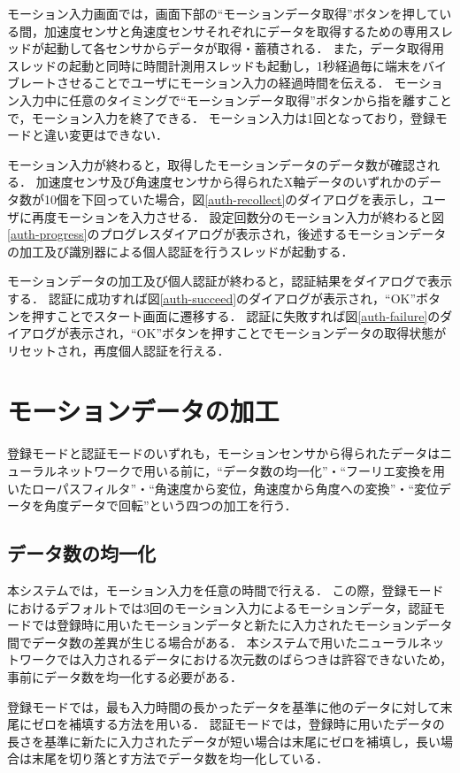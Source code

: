 モーション入力画面では，画面下部の``モーションデータ取得''ボタンを押している間，加速度センサと角速度センサそれぞれにデータを取得するための専用スレッドが起動して各センサからデータが取得・蓄積される．
また，データ取得用スレッドの起動と同時に時間計測用スレッドも起動し，1秒経過毎に端末をバイブレートさせることでユーザにモーション入力の経過時間を伝える．
モーション入力中に任意のタイミングで``モーションデータ取得''ボタンから指を離すことで，モーション入力を終了できる．
モーション入力は1回となっており，登録モードと違い変更はできない．

モーション入力が終わると，取得したモーションデータのデータ数が確認される．
加速度センサ及び角速度センサから得られたX軸データのいずれかのデータ数が10個を下回っていた場合，図\ref{auth-recollect}のダイアログを表示し，ユーザに再度モーションを入力させる．
設定回数分のモーション入力が終わると図\ref{auth-progress}のプログレスダイアログが表示され，後述するモーションデータの加工及び識別器による個人認証を行うスレッドが起動する．

モーションデータの加工及び個人認証が終わると，認証結果をダイアログで表示する．
認証に成功すれば図\ref{auth-succeed}のダイアログが表示され，``OK''ボタンを押すことでスタート画面に遷移する．
認証に失敗すれば図\ref{auth-failure}のダイアログが表示され，``OK''ボタンを押すことでモーションデータの取得状態がリセットされ，再度個人認証を行える．

\section{モーションデータの加工}
登録モードと認証モードのいずれも，モーションセンサから得られたデータはニューラルネットワークで用いる前に，``データ数の均一化''・``フーリエ変換を用いたローパスフィルタ''・``角速度から変位，角速度から角度への変換''・``変位データを角度データで回転''という四つの加工を行う．

\subsection{データ数の均一化}
本システムでは，モーション入力を任意の時間で行える．
この際，登録モードにおけるデフォルトでは3回のモーション入力によるモーションデータ，認証モードでは登録時に用いたモーションデータと新たに入力されたモーションデータ間でデータ数の差異が生じる場合がある．
本システムで用いたニューラルネットワークでは入力されるデータにおける次元数のばらつきは許容できないため，事前にデータ数を均一化する必要がある．

登録モードでは，最も入力時間の長かったデータを基準に他のデータに対して末尾にゼロを補填する方法を用いる．
認証モードでは，登録時に用いたデータの長さを基準に新たに入力されたデータが短い場合は末尾にゼロを補填し，長い場合は末尾を切り落とす方法でデータ数を均一化している．

